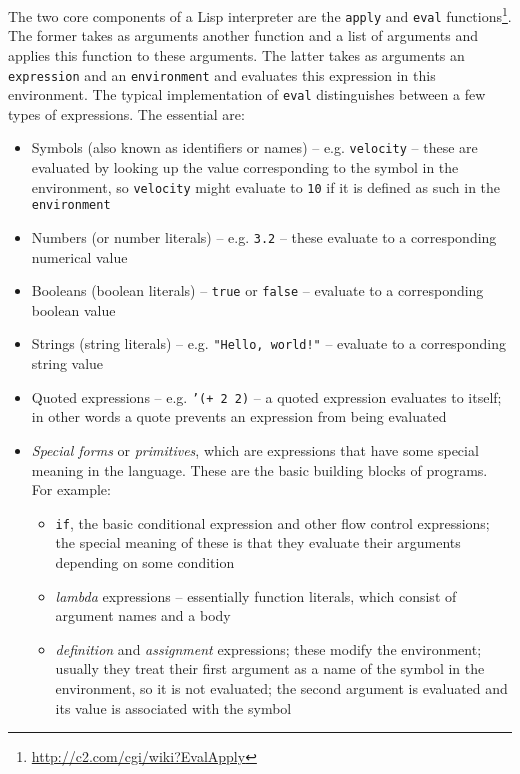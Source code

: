 The two core components of a Lisp interpreter are the \texttt{apply} and \texttt{eval} functions\cite{sicp_meta}\footnote{\url{http://c2.com/cgi/wiki?EvalApply}}. The former takes as arguments another function and a list of arguments and applies this function to these arguments. The latter takes as arguments an \texttt{expression} and an \texttt{environment} and evaluates this expression in this environment. The typical implementation of \texttt{eval} distinguishes between a few types of expressions. The essential are:
\begin{itemize}
	\item Symbols (also known as identifiers or names) -- e.g. \texttt{velocity} -- these are evaluated by looking up the value corresponding to the symbol in the environment, so \texttt{velocity} might evaluate to \texttt{10} if it is defined as such in the \texttt{environment}
	\item Numbers (or number literals) -- e.g. \texttt{3.2} -- these evaluate to a corresponding numerical value
	\item Booleans (boolean literals) -- \texttt{true} or \texttt{false} -- evaluate to a corresponding boolean value
	\item Strings (string literals) -- e.g. \texttt{"Hello, world!"} -- evaluate to a corresponding string value
	\item Quoted expressions -- e.g. \texttt{'(+ 2 2)} -- a quoted expression evaluates to itself; in other words a quote prevents an expression from being evaluated
	\item \textit{Special forms} or \textit{primitives}, which are expressions that have some special meaning in the language. These are the basic building blocks of programs. For example:
	\begin{itemize}
		\item \texttt{if}, the basic conditional expression and other flow control expressions; the special meaning of these is that they evaluate their arguments depending on some condition
		\item \textit{lambda} expressions -- essentially function literals, which consist of argument names and a body
		\item \textit{definition} and \textit{assignment} expressions; these modify the environment; usually they treat their first argument as a name of the symbol in the environment, so it is not evaluated; the second argument is evaluated and its value is associated with the symbol 
	\end{itemize}	 
\end{itemize}

